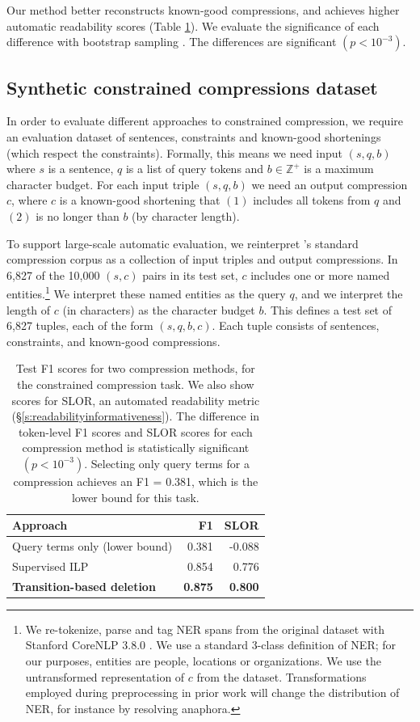\documentclass[11pt,a4paper]{article}
\begin{document}
Our method better reconstructs known-good compressions, and achieves higher automatic readability scores (Table \ref{t:results}). We evaluate the significance of each difference with bootstrap sampling \cite{D12-1091}. The differences are significant {\small $(p < 10^{-3})$}. 

\subsection{Synthetic constrained compressions dataset}

In order to evaluate different approaches to constrained compression, we require an evaluation dataset of sentences, constraints and known-good shortenings (which respect the constraints). Formally, this means we need input $(s, q, b)$ where $s$ is a sentence, $q$ is a list of query tokens and $b \in \mathbb{Z}^{+}$ is a maximum character budget. For each input triple $(s,q,b)$ we need an output compression $c$, where $c$ is a known-good shortening that $(1)$ includes all tokens from $q$ and $(2)$ is no longer than $b$ (by character length). 

To support large-scale automatic evaluation, we reinterpret 
\citeauthor{filippova2013overcoming}'s
standard compression corpus
as a collection of input triples and output compressions.
In 6,827 of the 10,000 $(s,c)$ pairs in its test set,
$c$ includes one or more named entities.\footnote{We re-tokenize, parse and tag NER spans from the original dataset with Stanford CoreNLP 3.8.0 \cite{corenlp}. We use a standard 3-class definition of NER; for our purposes, entities are people, locations or organizations. We use the untransformed representation of $c$ from the dataset. Transformations employed during preprocessing in prior work \cite{filippova2013overcoming} will change the distribution of NER, for instance by resolving anaphora.}
We interpret these named entities as the query $q$,
and we interpret the length of $c$ (in characters) as the character budget $b$.
This defines a test set of 6,827 tuples, each of the form $(s,q,b,c)$. Each tuple consists of sentences, constraints, and 
known-good compressions.

\begin{table}[]
\begin{tabular}{lrr}
\centering
Approach & F1 & SLOR  \\ \hline
Query terms only {\small (lower bound)} & 0.381 & -0.088 \\
Supervised ILP  &  0.854   &  0.776       \\
\textbf{Transition-based deletion} &  \textbf{0.875}  & \textbf{0.800}   \\
\end{tabular}
\caption{Test F1 scores for two compression methods, for the constrained compression task. We also show scores for SLOR, an automated readability metric (\S\ref{s:readabilityinformativeness}). The difference in token-level F1 scores and SLOR scores for each compression method is statistically significant {\small $(p < 10^{-3})$}. Selecting only query terms for a compression achieves an F1 = 0.381, which is the lower bound for this task.}
\label{t:results}
\end{table}
\end{document}
